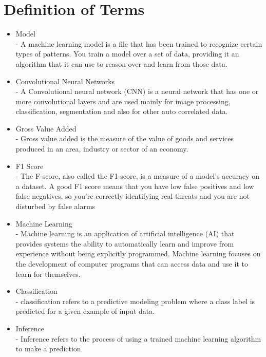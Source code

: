 \section{Definition of Terms}
    \begin{itemize}
        \item Model \\
              - A machine learning model is a file that has
              been trained to recognize certain types of patterns.
              You train a model over a set of data, providing it an
              algorithm that it can use to reason over and learn 
              from those data.

        \item Convolutional Neural Networks \\
              - A Convolutional neural network (CNN) is a neural network 
              that has one or more convolutional layers and are used mainly
              for image processing, classification, segmentation and also 
              for other auto correlated data.

        \item Gross Value Added \\
              - Gross value added is the measure of the value of 
              goods and services produced in an area, industry or sector 
              of an economy.

        \item F1 Score \\
              - The F-score, also called the F1-score, is a measure of a model's accuracy 
              on a dataset. A good F1 score means that you have low false positives and 
              low false negatives, so you're correctly identifying real threats and you are not disturbed by false alarms
              
        \item Machine Learning \\
              - Machine learning is an application of artificial intelligence 
              (AI) that provides systems the ability to automatically learn and
              improve from experience without being explicitly programmed. 
              Machine learning focuses on the development of computer programs 
              that can access data and use it to learn for themselves.

        \item Classification \\
              - classification refers to a predictive modeling problem where a
              class label is predicted for a given example of input data.
              
        \item Inference \\
              -  Inference refers to the process of using a trained machine learning algorithm to make a prediction
    \end{itemize}


